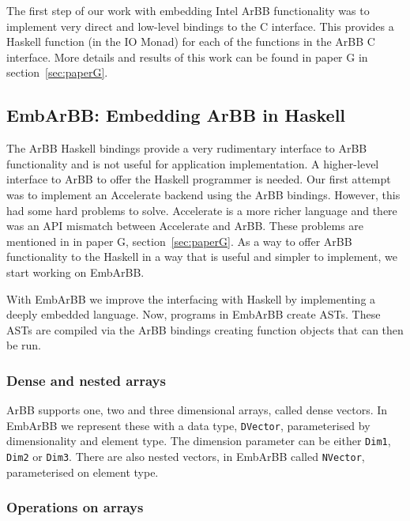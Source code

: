 \documentclass[a4paper]{book}
\begin{document}
The first step of our work with embedding Intel ArBB functionality was to implement very direct 
and low-level bindings to the C interface. This provides a Haskell function (in the IO Monad) 
for each of the functions in the ArBB C interface. More details and results of this work 
can be found in paper G in section~\ref{sec:paperG}.



\subsection{EmbArBB: Embedding ArBB in Haskell}
\label{sec:EmbArBB} 

The ArBB Haskell bindings provide a very rudimentary interface to ArBB functionality and 
is not useful for application implementation. A higher-level interface to ArBB to offer 
the Haskell programmer is needed. Our first attempt was to implement an Accelerate backend 
using the ArBB bindings. However, this had some hard problems to solve. Accelerate is a 
more richer language and there was an API mismatch between Accelerate and ArBB. These problems 
are mentioned in in paper G, section~\ref{sec:paperG}. As a way to offer ArBB functionality 
to the Haskell in a way that is useful and simpler to implement, we start working on EmbArBB. 

With EmbArBB we improve the interfacing with Haskell by implementing a deeply embedded language. 
Now, programs in EmbArBB create ASTs. These ASTs are compiled via the ArBB bindings creating 
function objects that can then be run. 

\subsubsection{Dense and nested arrays}

ArBB supports one, two and three dimensional arrays, called dense vectors. In EmbArBB we 
represent these with a data type, {\tt DVector}, parameterised by dimensionality and 
element type. The dimension parameter can be either {\tt Dim1}, {\tt Dim2} or {\tt Dim3}. 
There are also nested vectors, in EmbArBB called {\tt NVector}, parameterised on element type. 

\subsubsection{Operations on arrays} 
\end{document}
